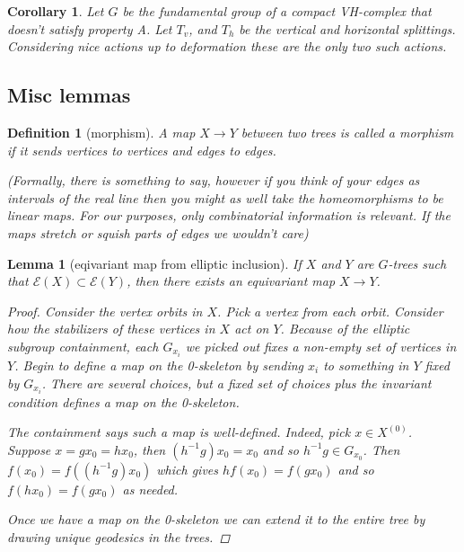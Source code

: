 \documentclass{article}
\theoremstyle{mystyle}
\newtheorem{lem}{Lemma}[section]
\newtheorem{defn}{Definition}
\newtheorem*{cor*}{Corollary}
\theoremstyle{remark}
\begin{document}
    \begin{cor*}
        Let \(G\) be the fundamental group of a compact VH-complex that doesn't satisfy {\em property A}. Let \(T_{v}\), and \(T_{h}\) be the vertical and horizontal splittings. Considering {\em nice} actions up to deformation these are the only two such actions. 
    \end{cor*}

\subsection{Misc lemmas}

\begin{defn}[morphism]
A map $X\to Y$ between two trees is called a morphism if it sends vertices to vertices and edges to edges. 

(Formally, there is something to say, however if you think of your edges as intervals of the real line then you might as well take the homeomorphisms to be linear maps. For our purposes, only combinatorial information is relevant. If the maps stretch or squish parts of edges we wouldn't care)
\end{defn}




\begin{lem}[eqivariant map from elliptic inclusion]
    If $X$ and $Y$ are \(G\)-trees such that $\mathcal{E}(X)\subset\mathcal{E}(Y)$, then there exists an equivariant map $X\to Y$.
 
 \begin{proof}
 Consider the vertex orbits in $X$. Pick a vertex from each orbit. Consider how the stabilizers of these vertices in $X$ act on $Y$. Because of the elliptic subgroup containment, each $G_{x_i}$ we picked out fixes a non-empty set of vertices in $Y$. Begin to define a map on the 0-skeleton by sending $x_i$ to something in $Y$ fixed by $G_{x_i}$. There are several choices, but a fixed set of choices plus the invariant condition defines a map on the 0-skeleton.
 
The containment says such a map is well-defined. Indeed, pick $x \in X^{(0)}$. Suppose $x=gx_0=hx_0$, then $(h^{-1}g)x_0 = x_0$ and so $h^{-1}g \in G_{x_0}$. Then $f(x_0)=f( (h^{-1}g)x_0)$ which gives $h f(x_0) = f(gx_0)$ and so $f(hx_0)=f(gx_0)$ as needed.
 
 Once we have a map on the 0-skeleton we can extend it to the entire tree by drawing unique geodesics in the trees.
\end{proof}
\end{lem}
\end{document}
